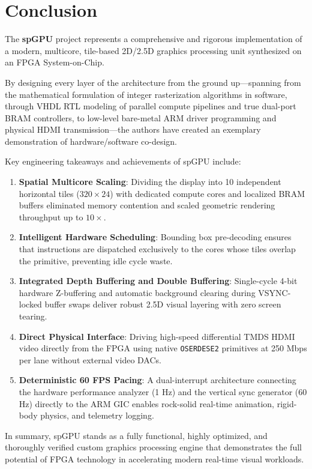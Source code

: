 \chapter{Conclusion}
\label{chap:conclusion}

The \textbf{spGPU} project represents a comprehensive and rigorous implementation of a modern, multicore, tile-based 2D/2.5D graphics processing unit synthesized on an FPGA System-on-Chip. 

By designing every layer of the architecture from the ground up---spanning from the mathematical formulation of integer rasterization algorithms in software, through VHDL RTL modeling of parallel compute pipelines and true dual-port BRAM controllers, to low-level bare-metal ARM driver programming and physical HDMI transmission---the authors have created an exemplary demonstration of hardware/software co-design.

Key engineering takeaways and achievements of spGPU include:
\begin{enumerate}
    \item \textbf{Spatial Multicore Scaling}: Dividing the display into 10 independent horizontal tiles ($320 \times 24$) with dedicated compute cores and localized BRAM buffers eliminated memory contention and scaled geometric rendering throughput up to $10\times$.
    \item \textbf{Intelligent Hardware Scheduling}: Bounding box pre-decoding ensures that instructions are dispatched exclusively to the cores whose tiles overlap the primitive, preventing idle cycle waste.
    \item \textbf{Integrated Depth Buffering and Double Buffering}: Single-cycle 4-bit hardware Z-buffering and automatic background clearing during VSYNC-locked buffer swaps deliver robust 2.5D visual layering with zero screen tearing.
    \item \textbf{Direct Physical Interface}: Driving high-speed differential TMDS HDMI video directly from the FPGA using native \texttt{OSERDESE2} primitives at 250 Mbps per lane without external video DACs.
    \item \textbf{Deterministic 60 FPS Pacing}: A dual-interrupt architecture connecting the hardware performance analyzer (1 Hz) and the vertical sync generator (60 Hz) directly to the ARM GIC enables rock-solid real-time animation, rigid-body physics, and telemetry logging.
\end{enumerate}

In summary, spGPU stands as a fully functional, highly optimized, and thoroughly verified custom graphics processing engine that demonstrates the full potential of FPGA technology in accelerating modern real-time visual workloads.
